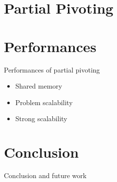 \documentclass{beamer}
\begin{document}
\section{Partial Pivoting}


\section{Performances}
\begin{frame}{Performances of partial pivoting}
\begin{itemize}
\item Shared memory
\item Problem scalability
\item Strong scalability
\end{itemize}
\end{frame}

\section*{Conclusion}
\begin{frame}{Conclusion and future work}
\end{frame}
\end{document}
